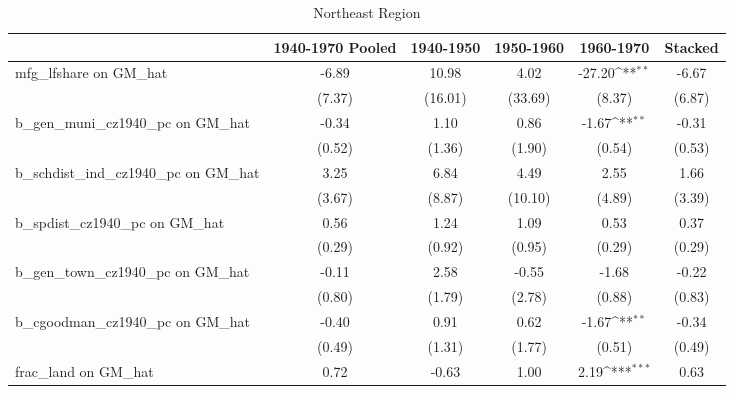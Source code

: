 \begin{table}[htbp]\centering
\def\sym#1{\ifmmode^{#1}\else\(^{#1}\)\fi}
\caption{Northeast Region}
\begin{tabular}{l*{5}{c}}
\toprule
                &\multicolumn{1}{c}{1940-1970 Pooled}&\multicolumn{1}{c}{1940-1950}&\multicolumn{1}{c}{1950-1960}&\multicolumn{1}{c}{1960-1970}&\multicolumn{1}{c}{Stacked}\\
\midrule
mfg\_lfshare on GM\_hat&    -6.89         &    10.98         &     4.02         &   -27.20\sym{**} &    -6.67         \\
                &   (7.37)         &  (16.01)         &  (33.69)         &   (8.37)         &   (6.87)         \\
\addlinespace
b\_gen\_muni\_cz1940\_pc on GM\_hat&    -0.34         &     1.10         &     0.86         &    -1.67\sym{**} &    -0.31         \\
                &   (0.52)         &   (1.36)         &   (1.90)         &   (0.54)         &   (0.53)         \\
\addlinespace
b\_schdist\_ind\_cz1940\_pc on GM\_hat&     3.25         &     6.84         &     4.49         &     2.55         &     1.66         \\
                &   (3.67)         &   (8.87)         &  (10.10)         &   (4.89)         &   (3.39)         \\
\addlinespace
b\_spdist\_cz1940\_pc on GM\_hat&     0.56         &     1.24         &     1.09         &     0.53         &     0.37         \\
                &   (0.29)         &   (0.92)         &   (0.95)         &   (0.29)         &   (0.29)         \\
\addlinespace
b\_gen\_town\_cz1940\_pc on GM\_hat&    -0.11         &     2.58         &    -0.55         &    -1.68         &    -0.22         \\
                &   (0.80)         &   (1.79)         &   (2.78)         &   (0.88)         &   (0.83)         \\
\addlinespace
b\_cgoodman\_cz1940\_pc on GM\_hat&    -0.40         &     0.91         &     0.62         &    -1.67\sym{**} &    -0.34         \\
                &   (0.49)         &   (1.31)         &   (1.77)         &   (0.51)         &   (0.49)         \\
\addlinespace
frac\_land on GM\_hat&     0.72         &    -0.63         &     1.00         &     2.19\sym{***}&     0.63         \\

\end{tabular}
\end{table}
